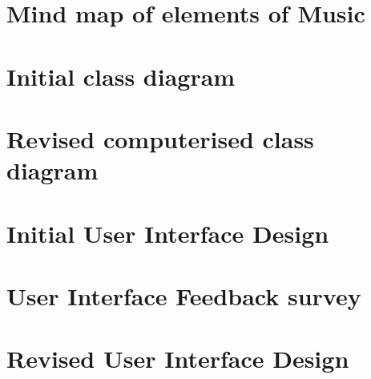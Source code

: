 \begin{appendices}
\section{Mind map of elements of Music}
\section{Initial class diagram}
\section{Revised computerised class diagram}
\section{Initial User Interface Design}
\section{User Interface Feedback survey}
\section{Revised User Interface Design}
\end{appendices}